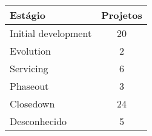 \begin{tabular}{l c}
  \hline
  {\bf Estágio} & {\bf Projetos} \\
  \hline
    Initial development & 20 \\
    Evolution & 2 \\
    Servicing & 6 \\
    Phaseout & 3 \\
    Closedown & 24 \\
    Desconhecido & 5 \\
  \hline
\end{tabular}
